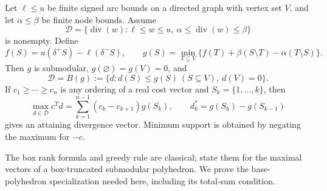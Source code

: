 \begin{lemma}\label{s5:box-base}
Let $\ell\le u$ be finite signed arc bounds on a directed graph with
vertex set $V$, and let $\alpha\le\beta$ be finite node bounds.
Assume
\[
 \mathcal D=\{\operatorname{div}(w):\ell\le w\le u,
                  \ \alpha\le\operatorname{div}(w)\le\beta\}
\]
is nonempty. Define
\begin{equation}
 f(S)=u(\delta^+S)-\ell(\delta^-S),\qquad
 g(S)=\min_{T\subseteq V}\{f(T)+\beta(S\setminus T)
                                     -\alpha(T\setminus S)\}.
 \label{s5:box-rank}
\end{equation}
Then $g$ is submodular, $g(\varnothing)=g(V)=0$, and
\[
 \mathcal D=B(g):=\{d:d(S)\le g(S)\ (S\subseteq V),\ d(V)=0\}.
\]
If $c_1\ge\cdots\ge c_n$ is any ordering of a real cost vector and
$S_k=\{1,\ldots,k\}$, then
\begin{equation}
 \max_{d\in\mathcal D}c^Td
   =\sum_{k=1}^{n-1}(c_k-c_{k+1})g(S_k),\qquad
 d_k^*=g(S_k)-g(S_{k-1})
 \label{s5:greedy-support}
\end{equation}
gives an attaining divergence vector. Minimum support is obtained by
negating the maximum for $-c$.
\end{lemma}

The box rank formula and greedy rule are classical; \citet[Theorems~1--2,
equation~(11), p.~192]{s5:shioura2013} state them for the
maximal vectors of a box-truncated submodular polyhedron. We prove the
base-polyhedron specialization needed here, including its total-sum condition.

